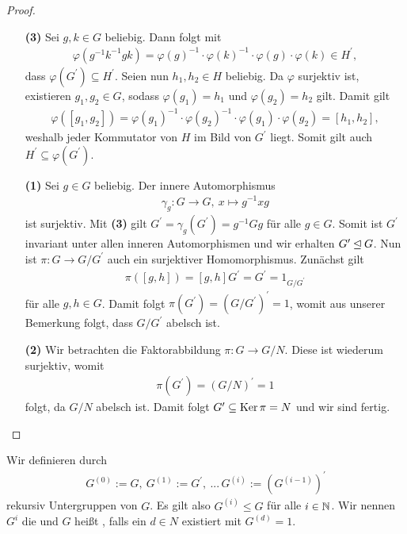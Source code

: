 \begin{proof} \
	\begin{enumerate}
		\item[\textbf{(3)}]
		Sei $ g,k \in G $ beliebig. Dann folgt mit 
		\begin{align*}
		\varphi( g^{-1} k^{-1} gk) = \varphi(g)^{-1} \cdot \varphi(k)^{-1} \cdot \varphi(g) \cdot \varphi(k) \in H^\prime,
		\end{align*}
		dass $ \varphi(G^\prime) \subseteq H^\prime $.
		Seien nun $ h_1,h_2 \in H $ beliebig. Da $ \varphi $ surjektiv ist, existieren $ g_1, g_2 \in G $, sodass 
		$ \varphi(g_1) = h_1 $ und $ \varphi(g_2) = h_2 $ gilt. Damit gilt
		\begin{align*}
		\varphi([g_1,g_2]) = \varphi(g_1)^{-1} \cdot \varphi(g_2)^{-1} \cdot \varphi(g_1) \cdot \varphi(g_2) = [h_1,h_2],
		\end{align*}
		weshalb jeder Kommutator von $ H $ im Bild von $ G^\prime $ liegt. Somit gilt auch $ H^\prime \subseteq \varphi(G^\prime) $.
		\item[\textbf{(1)}]
		Sei $ g \in G $ beliebig. Der innere Automorphismus
		\begin{align*}
		\gamma_g : G \to G, \ x \mapsto g^{-1}x g
		\end{align*}
		ist surjektiv. Mit \textbf{(3)} gilt $ G^\prime = \gamma_g(G^\prime) = g^{-1} G g $ für alle $ g \in G $.
		Somit ist $ G^\prime $ invariant unter allen inneren Automorphismen und wir erhalten $ G^\prime \unlhd G $.
		Nun ist $ \pi : G \to G / G^\prime $ auch ein surjektiver Homomorphismus.
		Zunächst gilt 
		\begin{align*}
		\pi([g,h]) = [g,h] G^\prime = G^\prime = 1_{G/G^\prime}
		\end{align*}
		für alle $ g,h \in G $. Damit folgt $ \pi( G^\prime) = (G / G^\prime )^\prime = 1 $, womit aus unserer Bemerkung folgt, dass $ G /G^\prime  $ abelsch ist.
		\item[\textbf{(2)}] 
		Wir betrachten die Faktorabbildung $ \pi : G \to G/N $. Diese ist wiederum surjektiv, womit
		\begin{align*}
		\pi ( G^\prime) = (G/N)^\prime = 1
		\end{align*}
		folgt, da $ G/N $ abelsch ist. Damit folgt $ G^\prime \subseteq \operatorname{Ker} \pi = N $ und wir sind fertig.
	\end{enumerate}
\end{proof}

\begin{df} \label{skript:4.3}  
	Wir definieren durch
	\begin{align*}
	G^{(0)} := G, \ G^{(1)} := G^\prime, \ ... \,G^{(i)} := (G^{(i-1)})^\prime
	\end{align*}
	rekursiv Untergruppen von $ G $. Es gilt also $ G^{(i)}  \leq G$ für alle $ i \in \mathbb{N} $.
	Wir nennen $ G^{i} $ die \bi{$ i $-te Kommutatorgruppe} und $ G $ heißt , falls ein $ d \in N $ existiert mit $ G^{(d)} = 1 $.
\end{df}

